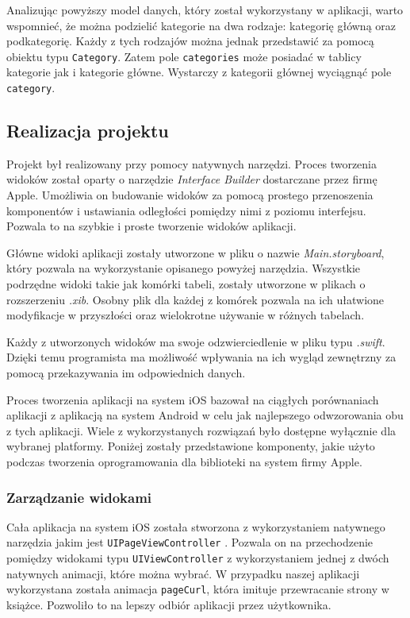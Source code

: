 \documentclass[twoside]{projektInzynierskiMS}
\begin{document}
Analizując powyższy model danych, który został wykorzystany w aplikacji, warto wspomnieć, że można podzielić kategorie na dwa rodzaje: kategorię główną oraz podkategorię. Każdy z tych rodzajów można jednak przedstawić za pomocą obiektu typu \verb`Category`. Zatem pole \verb`categories` może posiadać w tablicy kategorie jak i kategorie główne. Wystarczy z kategorii głównej wyciągnąć pole \verb`category`.


\subsection{Realizacja projektu}

Projekt był realizowany przy pomocy natywnych narzędzi. Proces tworzenia widoków został oparty o narzędzie \textit{Interface Builder} dostarczane przez firmę Apple. Umożliwia on budowanie widoków za pomocą prostego przenoszenia komponentów i ustawiania odległości pomiędzy nimi z poziomu interfejsu. Pozwala to na szybkie i proste tworzenie widoków aplikacji.

Główne widoki aplikacji zostały utworzone w pliku o nazwie \textit{Main.storyboard}, który pozwala na wykorzystanie opisanego powyżej narzędzia. Wszystkie podrzędne widoki takie jak komórki tabeli, zostały utworzone w plikach o rozszerzeniu \textit{.xib}. Osobny plik dla każdej z komórek pozwala na ich ułatwione modyfikacje w przyszłości oraz wielokrotne używanie w różnych tabelach.

Każdy z utworzonych widoków ma swoje odzwierciedlenie w pliku typu \textit{.swift}. Dzięki temu programista ma możliwość wpływania na ich wygląd zewnętrzny za pomocą przekazywania im odpowiednich danych.

Proces tworzenia aplikacji na system iOS bazował na ciągłych porównaniach aplikacji z aplikacją na system Android w celu jak najlepszego odwzorowania obu z tych aplikacji. Wiele z wykorzystanych rozwiązań było dostępne wyłącznie dla wybranej platformy. Poniżej zostały przedstawione komponenty, jakie użyto podczas tworzenia oprogramowania dla biblioteki na system firmy Apple.


\subsubsection{Zarządzanie widokami}

Cała aplikacja na system iOS została stworzona z wykorzystaniem natywnego narzędzia jakim jest \verb`UIPageViewController` \cite{AppleDeveloper}. Pozwala on na przechodzenie pomiędzy widokami typu \verb`UIViewController` z wykorzystaniem jednej z dwóch natywnych animacji, które można wybrać. W przypadku naszej aplikacji wykorzystana została animacja \verb`pageCurl`, która imituje przewracanie strony w książce. Pozwoliło to na lepszy odbiór aplikacji przez użytkownika.
\end{document}

